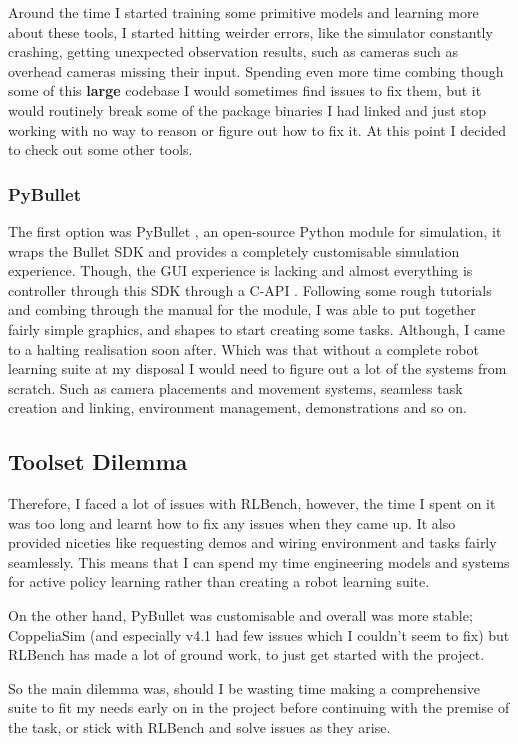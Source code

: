 Around the time I started training some primitive models and learning more about these tools, I started hitting weirder errors, like the simulator constantly crashing, getting unexpected observation results, such as cameras such as overhead cameras  missing their input. Spending even more time combing though some of this \textbf{large} codebase I would sometimes find issues to fix them, but it would routinely break some of the package binaries I had linked and just stop working with no way to reason or figure out how to fix it. At this point I decided to check out some other tools.

\subsubsection{PyBullet}
The first option was PyBullet \cite{pybullet}, an open-source Python module for simulation, it wraps the Bullet SDK \cite{bullet3} and provides a completely customisable simulation experience. Though, the GUI experience is lacking and almost everything is controller through this SDK through a C-API
. 
Following some rough tutorials and combing through the manual for the module, I was able to put together fairly simple graphics, and shapes to start creating some tasks. Although, I came to a halting realisation soon after. Which was that without a complete robot learning suite at my disposal I would need to figure out a lot of the systems from scratch. Such as camera placements and movement systems, seamless task creation and linking, environment management, demonstrations and so on.


\subsection{Toolset Dilemma}
Therefore, I faced a lot of issues with RLBench, however, the time I spent on it was too long and learnt how to fix any issues when they came up. It also provided niceties like requesting demos and wiring environment and tasks fairly seamlessly. This means that I can spend my time engineering models and systems for active policy learning rather than creating a robot learning suite.

On the other hand, PyBullet was customisable and overall was more stable; CoppeliaSim (and especially v4.1 had few issues which I couldn't seem to fix) but RLBench has made a lot of ground work, to just get started with the project.

So the main dilemma was, should I be wasting time making a comprehensive suite to fit my needs early on in the project before  continuing with the premise of the task, or stick with RLBench and solve issues as they arise.

